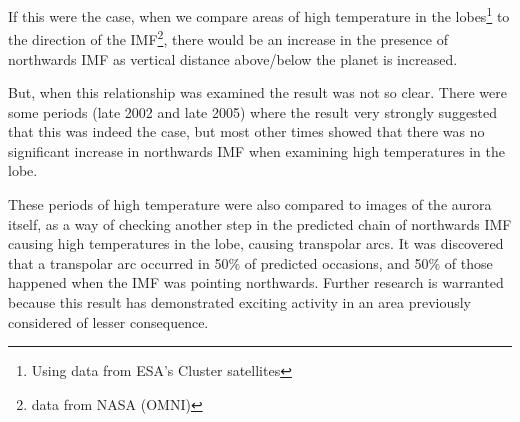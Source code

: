 \documentclass[12pt]{article}
\begin{document}
If this were the case, when we compare areas of high temperature in the lobes\footnote{Using data from ESA's Cluster satellites} to the direction of the IMF\footnote{data from NASA (OMNI)}, there would be an increase in the presence of northwards IMF as vertical distance above/below the planet is increased. 

But, when this relationship was examined the result was not so clear. There were some periods (late 2002 and late 2005) where the result very strongly suggested that this was indeed the case, but most other times showed that there was no significant increase in northwards IMF when examining high temperatures in the lobe. 

These periods of high temperature were also compared to images of the aurora itself, as a way of checking another step in the predicted chain of northwards IMF causing high temperatures in the lobe, causing transpolar arcs. It was discovered that a transpolar arc occurred in 50\% of predicted occasions, and 50\% of those happened when the IMF was pointing northwards. Further research is warranted because this result has demonstrated exciting activity in an area previously considered of lesser consequence.

\printbibliography
\end{document}
